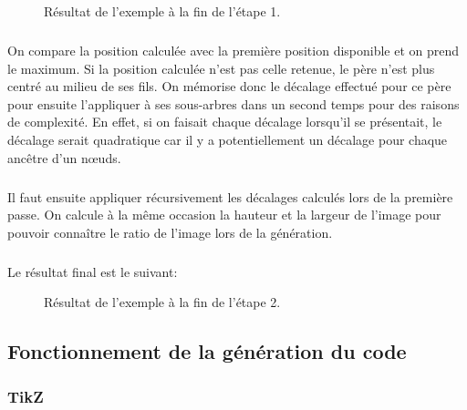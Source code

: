 \begin{figure}[h] \centering \resizebox {!}{4cm} {
}
\caption{Résultat de l'exemple à la fin de l'étape 1.}
\end{figure}

\subparagraph{}On compare la position calculée avec la première position disponible et on prend le maximum. Si la position calculée n'est pas celle retenue, le père n'est plus centré au milieu de ses fils. On mémorise donc le décalage effectué pour ce père pour ensuite l'appliquer à ses sous-arbres dans un second temps pour des raisons de complexité. En effet, si on faisait chaque décalage lorsqu'il se présentait, le décalage serait quadratique car il y a potentiellement un décalage pour chaque ancêtre d'un n\oe uds.
	


\subparagraph{}Il faut ensuite appliquer récursivement les décalages calculés lors de la première passe. On calcule à la même occasion la hauteur et la largeur de l'image pour pouvoir connaître le ratio de l'image lors de la génération.



\subparagraph{}Le résultat final est le suivant:

\begin{figure}[h] \centering \resizebox {!}{5cm} {
}
\caption{Résultat de l'exemple à la fin de l'étape 2.}
\end{figure}

	\subsection{Fonctionnement de la génération du code}
	
		\subsubsection*{TikZ}

		
